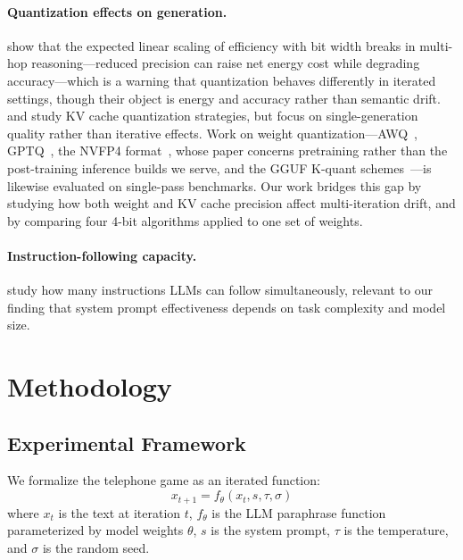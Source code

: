 \documentclass[11pt]{article}
\begin{document}
\paragraph{Quantization effects on generation.}
\citet{han2026quantization} show that the expected linear scaling of efficiency
with bit width breaks in multi-hop reasoning---reduced precision can raise net
energy cost while degrading accuracy---which is a warning that quantization
behaves differently in iterated settings, though their object is energy and
accuracy rather than semantic drift.
\citet{hooper2024kvquant} and \citet{liu2024kivi} study KV cache quantization
strategies, but focus on single-generation quality rather than iterative effects.
Work on weight quantization---AWQ~\citep{lin2024awq},
GPTQ~\citep{frantar2023gptq}, the NVFP4 format~\citep{nvidia2025nvfp4}, whose
paper concerns pretraining rather than the post-training inference builds we
serve, and the GGUF K-quant schemes~\citep{gerganov_llamacpp}---is likewise
evaluated on single-pass benchmarks. Our work bridges this gap by studying how both weight and KV cache
precision affect multi-iteration drift, and by comparing four 4-bit algorithms
applied to one set of weights.

\paragraph{Instruction-following capacity.}
\citet{jaroslawicz2025ifscale} study how many instructions LLMs can follow
simultaneously, relevant to our finding that system prompt effectiveness depends
on task complexity and model size.

\section{Methodology}
\label{sec:method}

\subsection{Experimental Framework}
\label{sec:framework}

We formalize the telephone game as an iterated function:
\begin{equation}
  x_{t+1} = f_\theta(x_t, s, \tau, \sigma)
\end{equation}
where $x_t$ is the text at iteration $t$, $f_\theta$ is the LLM paraphrase
function parameterized by model weights $\theta$, $s$ is the system prompt,
$\tau$ is the temperature, and $\sigma$ is the random seed.
\end{document}
